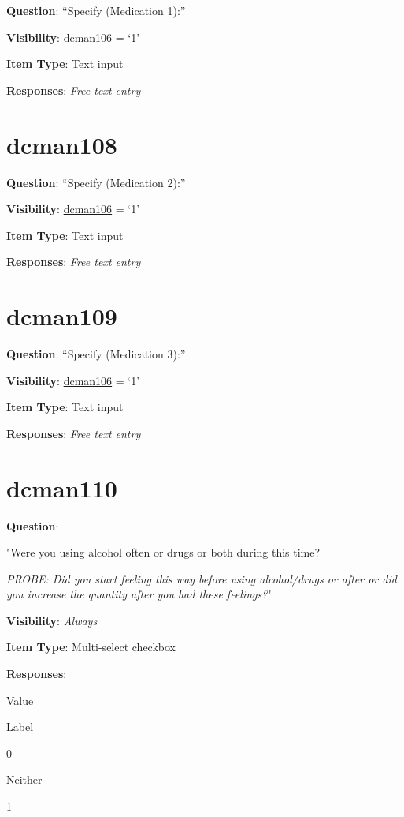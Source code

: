 \documentclass[]{book}
\begin{document}
\textbf{Question}: ``Specify (Medication 1):''

\textbf{Visibility}: \protect\hyperlink{dcman106}{dcman106} = `1'

\textbf{Item Type}: Text input

\textbf{Responses}: \emph{Free text entry}

\hypertarget{dcman108}{%
\section{dcman108}\label{dcman108}}

\textbf{Question}: ``Specify (Medication 2):''

\textbf{Visibility}: \protect\hyperlink{dcman106}{dcman106} = `1'

\textbf{Item Type}: Text input

\textbf{Responses}: \emph{Free text entry}

\hypertarget{dcman109}{%
\section{dcman109}\label{dcman109}}

\textbf{Question}: ``Specify (Medication 3):''

\textbf{Visibility}: \protect\hyperlink{dcman106}{dcman106} = `1'

\textbf{Item Type}: Text input

\textbf{Responses}: \emph{Free text entry}

\hypertarget{dcman110}{%
\section{dcman110}\label{dcman110}}

\textbf{Question}:

"Were you using alcohol often or drugs or both during this time?

\emph{PROBE: Did you start feeling this way before using alcohol/drugs or after or did you increase the quantity after you had these feelings?}"

\textbf{Visibility}: \emph{Always}

\textbf{Item Type}: Multi-select checkbox

\textbf{Responses}:

Value

Label

0

Neither

1
\end{document}
